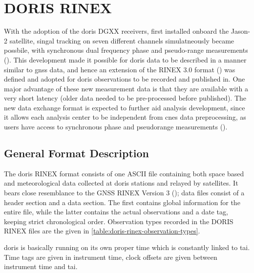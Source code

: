 \section{DORIS RINEX}\label{sec:doris-rinex}
With the adoption of the \gls{doris} DGXX receivers, first installed onboard the 
Jason-2 satellite, singal tracking on seven different channels simulatneously became 
possbile, with synchronous dual frequency phase and pseudo-range measurements 
(\cite{Mercier2010}). This development made it possible for \gls{doris} data to 
be described in a manner similar to \gls{gnss} data, and hence an extension of the 
RINEX 3.0 format (\cite{RINEX305}) was defined and adopted for \gls{doris} observations to be 
recorded and published in. One major advantage of these new measurement data is 
that they are available with a very short latency (older data needed to be pre-processed 
before published). The new data exchange format is expected to further aid analysis 
development, since it allows each analysis center to be independent from \gls{cnes}
data preprocessing, as users have access to synchronous phase and 
pseudorange measurements (\cite{Cerri2011}).

\subsection{General Format Description}
The \gls{doris} RINEX format consists of one ASCII file containing both space based 
and meteorological data collected at \gls{doris} stations and relayed by satellites.
It bears close resemblance to the GNSS RINEX Version 3 (\cite{RINEX305});
data files consist of a header section and a data section. The first contains 
global information for the entire file, while the latter contains the actual 
observations and a date tag, keeping strict chronological order.
Observation types recorded in the DORIS RINEX files are the given in 
\autoref{table:doris-rinex-observation-types}.

\gls{doris} is basically running on its own proper time which is constantly linked 
to \gls{tai}. Time tags are given in instrument time, clock offsets are given 
between instrument time and \gls{tai}.

